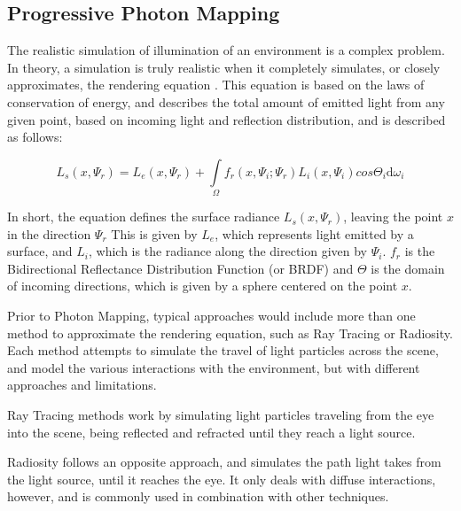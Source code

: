 \subsection{Progressive Photon Mapping}
\label{sec:photon}

The realistic simulation of illumination of an environment is a complex problem. In theory, a simulation is truly realistic when it completely simulates, or closely approximates, the rendering equation \cite{kajiya1986rendering}. This equation is based on the laws of conservation of energy, and describes the total amount of emitted light from any given point, based on incoming light and reflection distribution, and is described as follows:

\begin{figure}[!htp]
  \begin{equation}
    L_s(x, \Psi_r) = L_e(x, \Psi_r) + \int\limits_\Omega f_r(x, \Psi_i; \Psi_r) L_i(x, \Psi_i) cos\Theta_i \mathrm{d}\omega_i
  \end{equation}
  \label{eq:render}
\end{figure}

In short, the equation defines the surface radiance $L_s(x, \Psi_r)$, leaving the point $x$ in the direction $\Psi_r$ 
This is given by $L_e$, which represents light emitted by a surface, and $L_i$, which is the radiance along the direction given by $\Psi_i$. $f_r$ is the Bidirectional Reflectance Distribution Function (or BRDF) and $\Theta$ is the domain of incoming directions, which is given by a sphere centered on the point $x$. 

Prior to Photon Mapping, typical approaches would include more than one method to approximate the rendering equation, such as Ray Tracing or Radiosity. Each method attempts to simulate the travel of light particles across the scene, and model the various interactions with the environment, but with different approaches and limitations.

Ray Tracing methods work by simulating light particles traveling from the eye into the scene, being reflected and refracted until they reach a light source. 

Radiosity follows an opposite approach, and simulates the path light takes from the light source, until it reaches the eye. It only deals with diffuse interactions, however, and is commonly used in combination with other techniques.

